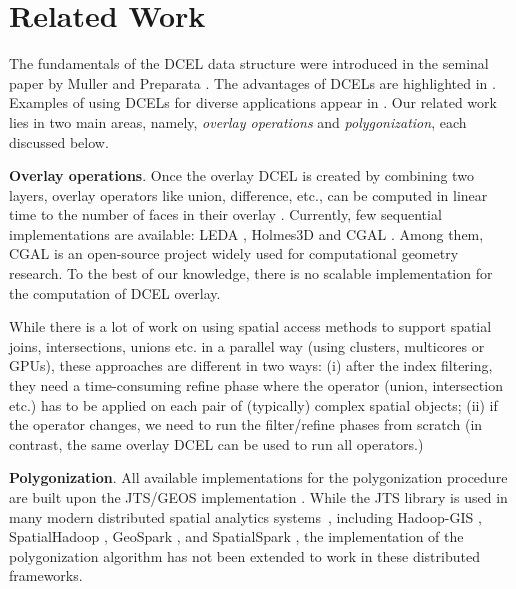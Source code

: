 \section{Related Work}\label{sec:related}
The fundamentals of the DCEL data structure were introduced in the seminal paper by Muller and Preparata  \cite{muller_finding_1978}. The advantages of DCELs are highlighted in \cite{preparata_computational_1985, berg_computational_2008}. Examples of using DCELs for diverse applications appear in \cite{barequet_dcel_1998, boltcheva_topological-based_2020, freiseisen_colored_1998}.
Our related work lies in two main areas, namely, \textit{overlay operations} and \textit{polygonization}, each discussed below.

\textbf{Overlay operations}.
Once the overlay DCEL is created by combining two layers, overlay operators like union, difference, etc., can be computed in linear time to the number of faces in their overlay \cite{freiseisen_colored_1998}. 
Currently, few sequential implementations are available: LEDA \cite{mehlhorn_leda_1995}, Holmes3D
\cite{holmes_dcel_2021} and CGAL \cite{fogel_cgal_2012}. Among them, CGAL is an open-source project widely used for computational geometry research. To the best of our knowledge, there is no scalable implementation for the computation of DCEL overlay.

While there is a lot of work on using spatial access methods to support spatial joins, intersections, unions etc. in a parallel way (using clusters, multicores or GPUs), \cite{challa_dd-rtree_2016, sabek_spatial_2017, li_scalable_2019, franklin_data_2018, magalhaes_fast_2015, puri_efficient_2013, puri_mapreduce_2013} these approaches are different in two ways: (i) after the index filtering, they need a time-consuming refine phase where the operator (union, intersection etc.) has to be applied on each pair of (typically) complex spatial objects; (ii) if the operator changes, we need to run the filter/refine phases from scratch (in contrast, the same overlay DCEL can be used to run all operators.)

\vspace{4pt}

\textbf{Polygonization}.
All available implementations for the polygonization procedure are built upon the JTS/GEOS implementation \cite{web:jts:polygonizer, web:geos:polygonizer}. 
While the JTS library is used in many modern distributed spatial analytics systems~\cite{PVK21}, including Hadoop-GIS \cite{AWV+13}, SpatialHadoop \cite{EM15}, 
GeoSpark \cite{YZS18}, and SpatialSpark \cite{YZG15}, the implementation of the polygonization algorithm \cite{web:jts:polygonizer} has not been extended to 
work in these distributed frameworks.


